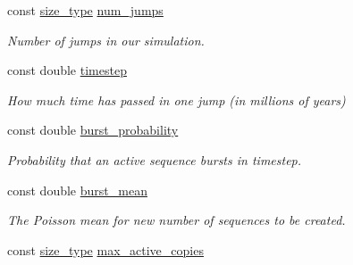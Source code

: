 \begin{DoxyCompactItemize}
\item 
\mbox{\label{classrcombinator_1_1Evolution_a9e4feea87909393e38280bf12c9ef2fc}} 
const \mbox{\hyperlink{constants_8h_abcd18a5521fc90ff6e7b00e4fee98397}{size\+\_\+type}} \mbox{\hyperlink{classrcombinator_1_1Evolution_a9e4feea87909393e38280bf12c9ef2fc}{num\+\_\+jumps}}
\begin{DoxyCompactList}\small\item\em Number of jumps in our simulation. \end{DoxyCompactList}\item 
\mbox{\label{classrcombinator_1_1Evolution_a4199e62af41c1d4131547a0fa1eaedbe}} 
const double \mbox{\hyperlink{classrcombinator_1_1Evolution_a4199e62af41c1d4131547a0fa1eaedbe}{timestep}}
\begin{DoxyCompactList}\small\item\em How much time has passed in one jump (in millions of years) \end{DoxyCompactList}\item 
\mbox{\label{classrcombinator_1_1Evolution_aabe7c0fa6f08d6b891762957770efafe}} 
const double \mbox{\hyperlink{classrcombinator_1_1Evolution_aabe7c0fa6f08d6b891762957770efafe}{burst\+\_\+probability}}
\begin{DoxyCompactList}\small\item\em Probability that an active sequence bursts in {\itshape timestep}. \end{DoxyCompactList}\item 
\mbox{\label{classrcombinator_1_1Evolution_aaf24044a7c370487557c55e5c12fe1e5}} 
const double \mbox{\hyperlink{classrcombinator_1_1Evolution_aaf24044a7c370487557c55e5c12fe1e5}{burst\+\_\+mean}}
\begin{DoxyCompactList}\small\item\em The Poisson mean for new number of sequences to be created. \end{DoxyCompactList}\item 
\mbox{\label{classrcombinator_1_1Evolution_a8a542398bf9a3a7d42623d4d090a6e96}} 
const \mbox{\hyperlink{constants_8h_abcd18a5521fc90ff6e7b00e4fee98397}{size\+\_\+type}} \mbox{\hyperlink{classrcombinator_1_1Evolution_a8a542398bf9a3a7d42623d4d090a6e96}{max\+\_\+active\+\_\+copies}}

\end{DoxyCompactItemize}
